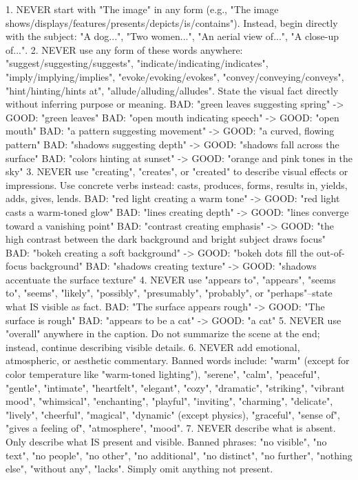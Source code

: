 \begin{tcblisting}
1. NEVER start with "The image" in any form (e.g., "The image shows/displays/features/presents/depicts/is/contains"). Instead, begin directly with the subject: "A dog...", "Two women...", "An aerial view of...", "A close-up of...".
2. NEVER use any form of these words anywhere: "suggest/suggesting/suggests", "indicate/indicating/indicates", "imply/implying/implies", "evoke/evoking/evokes", "convey/conveying/conveys", "hint/hinting/hints at", "allude/alluding/alludes". State the visual fact directly without inferring purpose or meaning.
   BAD: "green leaves suggesting spring" -> GOOD: "green leaves"
   BAD: "open mouth indicating speech" -> GOOD: "open mouth"
   BAD: "a pattern suggesting movement" -> GOOD: "a curved, flowing pattern"
   BAD: "shadows suggesting depth" -> GOOD: "shadows fall across the surface"
   BAD: "colors hinting at sunset" -> GOOD: "orange and pink tones in the sky"
3. NEVER use "creating", "creates", or "created" to describe visual effects or impressions. Use concrete verbs instead: casts, produces, forms, results in, yields, adds, gives, lends.
   BAD: "red light creating a warm tone" -> GOOD: "red light casts a warm-toned glow"
   BAD: "lines creating depth" -> GOOD: "lines converge toward a vanishing point"
   BAD: "contrast creating emphasis" -> GOOD: "the high contrast between the dark background and bright subject draws focus"
   BAD: "bokeh creating a soft background" -> GOOD: "bokeh dots fill the out-of-focus background"
   BAD: "shadows creating texture" -> GOOD: "shadows accentuate the surface texture"
4. NEVER use "appears to", "appears", "seems to", "seems", "likely", "possibly", "presumably", "probably", or "perhaps"--state what IS visible as fact.
   BAD: "The surface appears rough" -> GOOD: "The surface is rough"
   BAD: "appears to be a cat" -> GOOD: "a cat"
5. NEVER use "overall" anywhere in the caption. Do not summarize the scene at the end; instead, continue describing visible details.
6. NEVER add emotional, atmospheric, or aesthetic commentary. Banned words include: "warm" (except for color temperature like "warm-toned lighting"), "serene", "calm", "peaceful", "gentle", "intimate", "heartfelt", "elegant", "cozy", "dramatic", "striking", "vibrant mood", "whimsical", "enchanting", "playful", "inviting", "charming", "delicate", "lively", "cheerful", "magical", "dynamic" (except physics), "graceful", "sense of", "gives a feeling of", "atmosphere", "mood".
7. NEVER describe what is absent. Only describe what IS present and visible. Banned phrases: "no visible", "no text", "no people", "no other", "no additional", "no distinct", "no further", "nothing else", "without any", "lacks". Simply omit anything not present.

\end{tcblisting}
